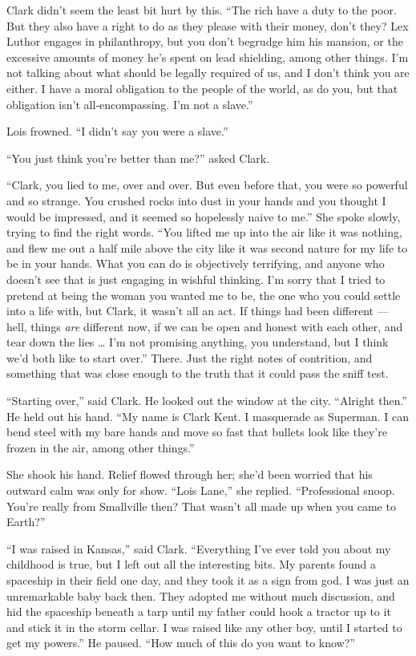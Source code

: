 Clark didn't seem the least bit hurt by this. ``The rich have a duty to
the poor. But they also have a right to do as they please with their
money, don't they? Lex Luthor engages in philanthropy, but you don't
begrudge him his mansion, or the excessive amounts of money he's spent
on lead shielding, among other things. I'm not talking about what should
be legally required of us, and I don't think you are either. I have a
moral obligation to the people of the world, as do you, but that
obligation isn't all‐encompassing. I'm not a slave.''

Lois frowned. ``I didn't say you were a slave.''

``You just think you're better than me?'' asked Clark.

``Clark, you lied to me, over and over. But even before that, you were
so powerful and so strange. You crushed rocks into dust in your hands
and you thought I would be impressed, and it seemed so hopelessly naive
to me.'' She spoke slowly, trying to find the right words. ``You lifted
me up into the air like it was nothing, and flew me out a half mile
above the city like it was second nature for my life to be in your
hands. What you can do is objectively terrifying, and anyone who doesn't
see that is just engaging in wishful thinking. I'm sorry that I tried to
pretend at being the woman you wanted me to be, the one who you could
settle into a life with, but Clark, it wasn't all an act. If things had
been different --- hell, things \emph{are} different now, if we can be
open and honest with each other, and tear down the lies \ldots{} I'm not
promising anything, you understand, but I think we'd both like to start
over.'' There. Just the right notes of contrition, and something that
was close enough to the truth that it could pass the sniff test.

``Starting over,'' said Clark. He looked out the window at the city.
``Alright then.'' He held out his hand. ``My name is Clark Kent. I
masquerade as Superman. I can bend steel with my bare hands and move so
fast that bullets look like they're frozen in the air, among other
things.''

She shook his hand. Relief flowed through her; she'd been worried that
his outward calm was only for show. ``Lois Lane,'' she replied.
``Professional snoop. You're really from Smallville then? That wasn't
all made up when you came to Earth?''

``I was raised in Kansas,'' said Clark. ``Everything I've ever told you
about my childhood is true, but I left out all the interesting bits. My
parents found a spaceship in their field one day, and they took it as a
sign from god. I was just an unremarkable baby back then. They adopted
me without much discussion, and hid the spaceship beneath a tarp until
my father could hook a tractor up to it and stick it in the storm
cellar. I was raised like any other boy, until I started to get my
powers.'' He paused. ``How much of this do you want to know?''

